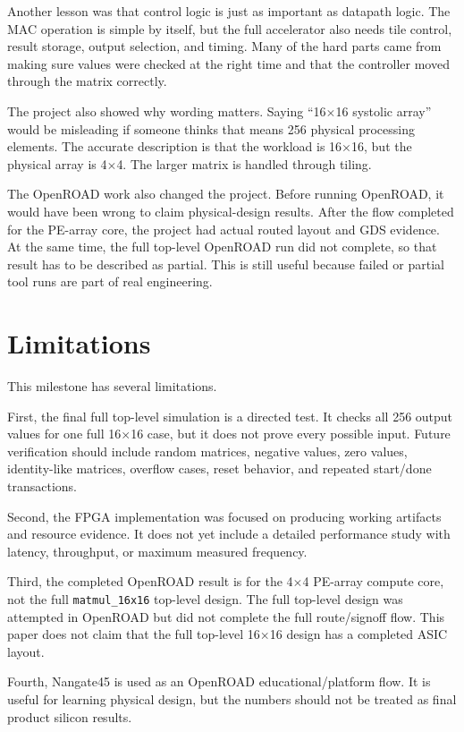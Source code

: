 \documentclass[conference]{IEEEtran}
\begin{document}
Another lesson was that control logic is just as important as datapath logic. The MAC operation is simple by itself, but the full accelerator also needs tile control, result storage, output selection, and timing. Many of the hard parts came from making sure values were checked at the right time and that the controller moved through the matrix correctly.

The project also showed why wording matters. Saying ``16$\times$16 systolic array'' would be misleading if someone thinks that means 256 physical processing elements. The accurate description is that the workload is 16$\times$16, but the physical array is 4$\times$4. The larger matrix is handled through tiling.

The OpenROAD work also changed the project. Before running OpenROAD, it would have been wrong to claim physical-design results. After the flow completed for the PE-array core, the project had actual routed layout and GDS evidence. At the same time, the full top-level OpenROAD run did not complete, so that result has to be described as partial. This is still useful because failed or partial tool runs are part of real engineering.

\section{Limitations}

This milestone has several limitations.

First, the final full top-level simulation is a directed test. It checks all 256 output values for one full 16$\times$16 case, but it does not prove every possible input. Future verification should include random matrices, negative values, zero values, identity-like matrices, overflow cases, reset behavior, and repeated start/done transactions.

Second, the FPGA implementation was focused on producing working artifacts and resource evidence. It does not yet include a detailed performance study with latency, throughput, or maximum measured frequency.

Third, the completed OpenROAD result is for the 4$\times$4 PE-array compute core, not the full \texttt{matmul\_16x16} top-level design. The full top-level design was attempted in OpenROAD but did not complete the full route/signoff flow. This paper does not claim that the full top-level 16$\times$16 design has a completed ASIC layout.

Fourth, Nangate45 is used as an OpenROAD educational/platform flow. It is useful for learning physical design, but the numbers should not be treated as final product silicon results.
\end{document}

